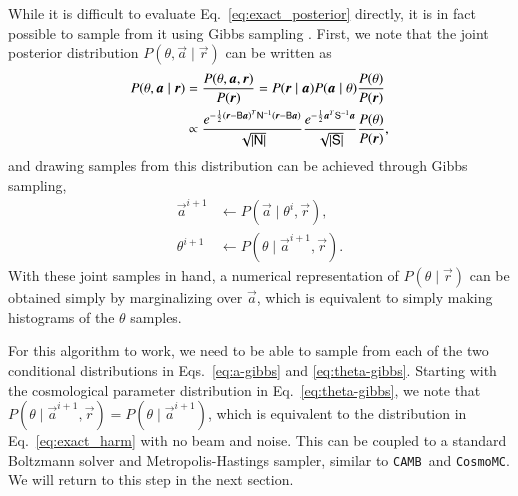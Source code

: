 \documentclass[twocolumn]{../common/aa}
\def\cosmomc{\texttt{CosmoMC}}
\def\camb{\texttt{CAMB}}
\newcommand{\B}[0]{\tens{B}}
\renewcommand{\a}[0]{\vec{a}}
\newcommand{\N}[0]{\tens{N}}
\renewcommand{\S}[0]{\tens{S}}
\renewcommand{\r}[0]{\vec{r}}
\begin{document}
While it is difficult to evaluate Eq.~\eqref{eq:exact_posterior} directly, it is in fact possible to sample from it using Gibbs sampling \citep{jewell2004,wandelt2004}. First, we note that the joint posterior distribution $P(\theta, \a \mid \r)$ can be written as
\begin{align}
    \nonumber
    P(\theta, \a \mid \r) &= \frac{P(\theta, \a, \r)}{P(\r)} = P(\r \mid \a)P(\a\mid \theta)\frac{P(\theta)}{P(\r)}\\
    \label{eq:joint-posterior}
    &\propto \frac{e^{-\frac12 \left(\r-\B\a \right)^T \N^{-1}\left(\r-\B\a \right)}}{\sqrt{\left|\N\right|}}
    \frac{e^{-\frac12 \a^T \S^{-1}\a}}{\sqrt{\left|\S\right|}}\frac{P(\theta)}{P(\r)},
\end{align}
and drawing samples from this distribution can be achieved through Gibbs sampling,
\begin{align}
    \label{eq:a-gibbs}
    \a^{i+1} &\leftarrow P(\a \mid \theta^{i}, \r),\\
    \label{eq:theta-gibbs}
    \theta^{i+1} &\leftarrow P(\theta \mid \a^{i+1}, \r).
\end{align}
With these joint samples in hand, a numerical representation of $P(\theta \mid \r)$ can be obtained simply by marginalizing over $\a$, which is equivalent to simply making histograms of the $\theta$ samples.

For this algorithm to work, we need to be able to sample from each of the two conditional distributions in Eqs.~\eqref{eq:a-gibbs} and \eqref{eq:theta-gibbs}. Starting with the cosmological parameter distribution in Eq.~\eqref{eq:theta-gibbs}, we note that $P(\theta \mid \a^{i+1}, \r) = P(\theta \mid \a^{i+1})$, which is equivalent to the distribution in Eq.~\eqref{eq:exact_harm} with no beam and noise. This can be coupled to a standard Boltzmann solver and Metropolis-Hastings sampler, similar to \camb\ and \cosmomc. We will return to this step in the next section.
\end{document}
